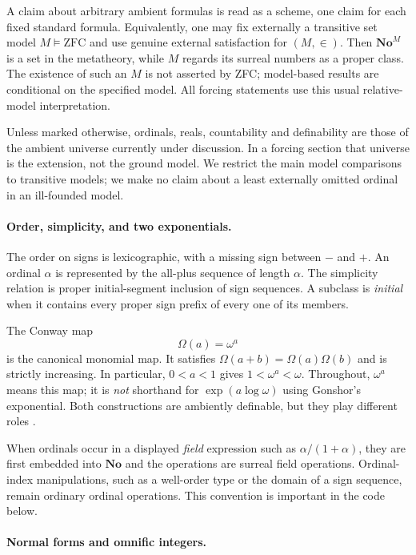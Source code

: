 \documentclass[11pt,a4paper]{article}
\numberwithin{equation}{section}
\theoremstyle{definition}
\theoremstyle{remark}
\newcommand{\No}{\mathbf{No}}
\begin{document}
A claim about arbitrary ambient formulas is read as a scheme, one claim
for each fixed standard formula. Equivalently, one may fix externally a
transitive set model $M\models\mathrm{ZFC}$ and use genuine external
satisfaction for $(M,\in)$. Then $\No^M$ is a set in the metatheory, while
$M$ regards its surreal numbers as a proper class. The existence of such
an $M$ is not asserted by ZFC; model-based results are conditional on the
specified model. All forcing statements use this usual relative-model
interpretation.

Unless marked otherwise, ordinals, reals, countability and definability
are those of the ambient universe currently under discussion. In a
forcing section that universe is the extension, not the ground model.
We restrict the main model comparisons to transitive models; we make no
claim about a least externally omitted ordinal in an ill-founded model.

\paragraph{Order, simplicity, and two exponentials.}

The order on signs is lexicographic, with a missing sign between $-$ and
$+$. An ordinal $\alpha$ is represented by the all-plus sequence of length
$\alpha$. The simplicity relation is proper initial-segment inclusion
of sign sequences. A subclass is \emph{initial} when it contains every
proper sign prefix of every one of its members.

The Conway map
\[
\Omega(a)=\omega^a
\]
is the canonical monomial map. It satisfies
$\Omega(a+b)=\Omega(a)\Omega(b)$ and is strictly increasing. In particular,
$0<a<1$ gives $1<\omega^a<\omega$. Throughout, $\omega^a$ means this
map; it is \emph{not} shorthand for
$\exp(a\log\omega)$ using Gonshor's exponential. Both constructions are
ambiently definable, but they play different roles \cite{Gonshor,EhrlichKaplanJSL}.

When ordinals occur in a displayed \emph{field} expression such as
$\alpha/(1+\alpha)$, they are first embedded into $\No$ and the operations
are surreal field operations. Ordinal-index manipulations, such as a
well-order type or the domain of a sign sequence, remain ordinary ordinal
operations. This convention is important in the code below.

\paragraph{Normal forms and omnific integers.}
\end{document}

